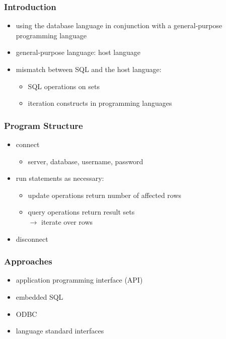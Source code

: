 \documentclass[dvipsnames]{beamer}
\theoremstyle{plain}
\begin{document}
\begin{frame}
  \frametitle{Introduction}

  \begin{itemize}
    \item using the database language in conjunction with a general-purpose
      programming language
    \item general-purpose language: \alert{host language}

    \pause
    \bigskip
    \item mismatch between SQL and the host language:
    \begin{itemize}
      \item SQL operations on sets
      \item iteration constructs in programming languages
    \end{itemize}
  \end{itemize}
\end{frame}

\begin{frame}
  \frametitle{Program Structure}

  \begin{itemize}
    \item connect
    \begin{itemize}
      \item server, database, username, password
    \end{itemize}

    \pause
    \medskip
    \item run statements as necessary:
    \begin{itemize}
      \item update operations return number of affected rows
      \item query operations return result sets\\
        $\rightarrow$ iterate over rows
    \end{itemize}

    \pause
    \medskip
    \item disconnect
  \end{itemize}
\end{frame}

\begin{frame}
  \frametitle{Approaches}

  \begin{itemize}
    \item application programming interface (API)
    \item embedded SQL
    \item ODBC
    \item language standard interfaces
  \end{itemize}
\end{frame}
\end{document}

